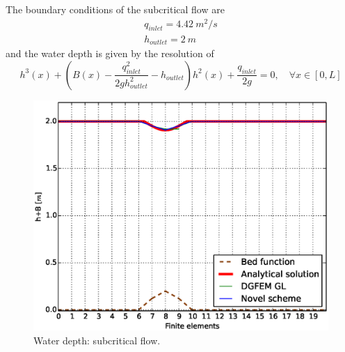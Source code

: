  The boundary conditions of the subcritical flow are
\begin{equation}
\begin{array}{c}
q_{inlet}=4.42 \ m^2/s\\
h_{outlet}=2 \ m
\end{array}
\end{equation}
and the water depth is given by the resolution of 
\begin{equation}
h^3(x)+\left( B(x)-\frac{q _{inlet}^2}{2g h_{outlet}^2}-h _{outlet}\right)h^2(x)+\frac{q _{inlet}}{2 g}=0,\quad \forall x \in [0,L]
\end{equation}

				\begin{figure}[!ht]
								\centering
								 \begin{minipage}[t]{0.44\textwidth}
								    \begin{center}
								    \includegraphics[width=1.0\textwidth]{OBR/bump/subH.eps}
								    \caption{Water depth: subcritical flow.}
								    \label{subH}
								    \end{center}
								\end{minipage}\hspace{15mm}
								\begin{minipage}[t]{0.44\textwidth}
								    \begin{center}

\end{center}
\end{minipage}
\end{figure}
